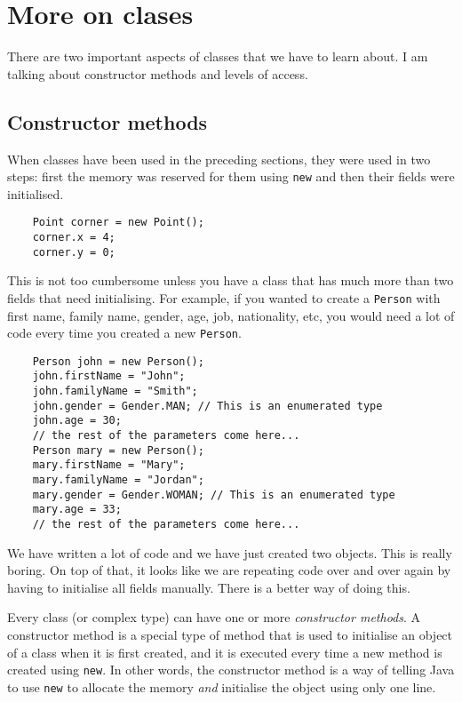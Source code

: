 
\section{More on clases}
\label{sec:more-clases}

There are two important aspects of classes that we have to learn
about. I am talking about constructor methods and levels of access. 

\subsection{Constructor methods}
\label{sec:constructor-methods}

When classes have been used in the preceding sections, they were used
in two steps: first the memory was reserved for them using \verb+new+
and then their fields were initialised. 

\begin{verbatim}
    Point corner = new Point();
    corner.x = 4;
    corner.y = 0;
\end{verbatim}

This is not too cumbersome unless you have a class that has much more
than two fields that need initialising. For example, if you wanted to
create a \verb+Person+ with first name, family name, gender, age, job,
nationality, etc, you would need a lot of code every time you created
a new \verb+Person+. 

\begin{verbatim}
    Person john = new Person();
    john.firstName = "John";
    john.familyName = "Smith";
    john.gender = Gender.MAN; // This is an enumerated type
    john.age = 30;
    // the rest of the parameters come here...
    Person mary = new Person();
    mary.firstName = "Mary";
    mary.familyName = "Jordan";
    mary.gender = Gender.WOMAN; // This is an enumerated type
    mary.age = 33;
    // the rest of the parameters come here...
\end{verbatim}

We have written a lot of code and we have just created two
objects. This is really boring. On top of that, it looks like we are
repeating code over and over again by having to initialise all fields
manually. There is a better way of doing this. 

Every class (or complex type) can have one or more \emph{constructor
  methods}. A constructor method is a special type of method that is
used to initialise an object of a class when it is first created, and
it is executed every time a new method is created using \verb+new+. In
other words, the constructor method is a way of telling Java to use
\verb+new+ to allocate the memory \emph{and} initialise the object
using only one line. 

